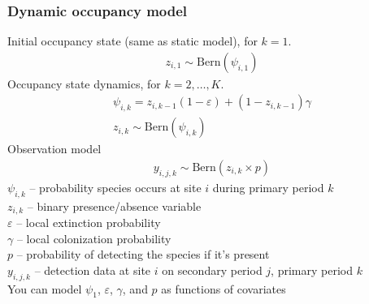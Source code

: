 \documentclass[color=usenames,dvipsnames]{beamer}\usepackage[]{graphicx}\usepackage[]{color}
\begin{document}
\begin{frame}
  \frametitle{Dynamic occupancy model}
  \small
  Initial occupancy state (same as static model), for $k=1$.
  \begin{gather*}
    z_{i,1} \sim \mathrm{Bern}(\psi_{i,1})
  \end{gather*}
  \pause
  Occupancy state dynamics, for $k=2, \dots, K$.
  \begin{gather*}
    \psi_{i,k} = z_{i,k-1}(1-\varepsilon) +  (1-z_{i,k-1})\gamma \\
    z_{i,k} \sim \mathrm{Bern}(\psi_{i,k})
  \end{gather*}
  \pause
  Observation model
  \begin{gather*}
    y_{i,j,k} \sim \mathrm{Bern}(z_{i,k}\times p)
  \end{gather*}
  \pause
  \footnotesize
  $\psi_{i,k}$ -- probability species occurs at site $i$ during primary period $k$ \\
  $z_{i,k}$ -- binary presence/absence variable \\
  $\varepsilon$ -- local extinction probability \\
  $\gamma$ -- local colonization probability \\
  $p$ -- probability of detecting the species if it's present \\
  $y_{i,j,k}$ -- detection data at site $i$ on secondary period $j$, primary period $k$ \\
  \pause \vfill
  \centering
  \small
  You can model $\psi_1$, $\varepsilon$, $\gamma$, and $p$ as
  functions of covariates \\
\end{frame}


\end{document}
